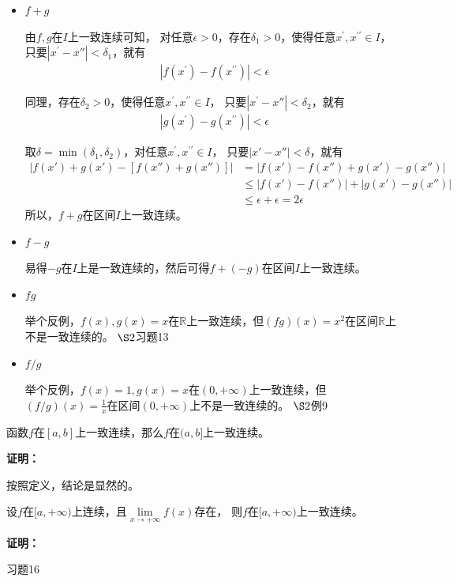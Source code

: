 \documentclass{article}
\begin{document}
\begin{itemize}
  \item $f + g$

        由$f, g$在$I$上一致连续可知，
        对任意$\epsilon > 0$，存在$\delta_1 > 0$，使得任意$x^\prime, x^{\prime\prime} \in I$，
        只要$|x^\prime - x''| < \delta_1$，就有
        \begin{align*}
          |f(x^\prime) - f(x^{\prime\prime})| < \epsilon
        \end{align*}

        同理，存在$\delta_2 > 0$，使得任意$x^\prime, x^{\prime\prime} \in I$，
        只要$|x^\prime - x''| < \delta_2$，就有
        \begin{align*}
          |g(x^\prime) - g(x^{\prime\prime})| < \epsilon
        \end{align*}

        取$\delta = \min(\delta_1, \delta_2)$，对任意$x^\prime, x^{\prime\prime} \in I$，
        只要$|x' - x''| < \delta$，就有
        \begin{align*}
          |f(x') + g(x') - [f(x'') + g(x'')]|
           & = |f(x') - f(x'') + g(x') - g(x'')|      \\
           & \leq |f(x') - f(x'')| + |g(x') - g(x'')| \\
           & \leq \epsilon + \epsilon = 2\epsilon
        \end{align*}
        所以，$f + g$在区间$I$上一致连续。

  \item $f - g$

        易得$-g$在$I$上是一致连续的，然后可得$f + (-g)$在区间$I$上一致连续。

  \item $fg$

        举个反例，$f(x), g(x) = x$在$\mathbb{R}$上一致连续，但$(fg)(x) = x^2$在区间$\mathbb{R}$上不是一致连续的。
        $\S 2$习题13

  \item $f/g$

        举个反例，$f(x) = 1, g(x) = x$在$(0, +\infty)$上一致连续，但$(f/g)(x) = \frac{1}{x}$在区间$(0, +\infty)$上不是一致连续的。
        $\S 2$例9

\end{itemize}

\begin{zremark}
  函数$f$在$[a, b]$上一致连续，那么$f$在$(a, b]$上一致连续。
\end{zremark}

\textbf{证明：}

按照定义，结论是显然的。

\begin{zremark}
  设$f$在$[a, +\infty)$上连续，且$\lim\limits_{x \to +\infty} f(x)$存在，
  则$f$在$[a, +\infty)$上一致连续。
\end{zremark}

\textbf{证明：}

习题16
\end{document}
